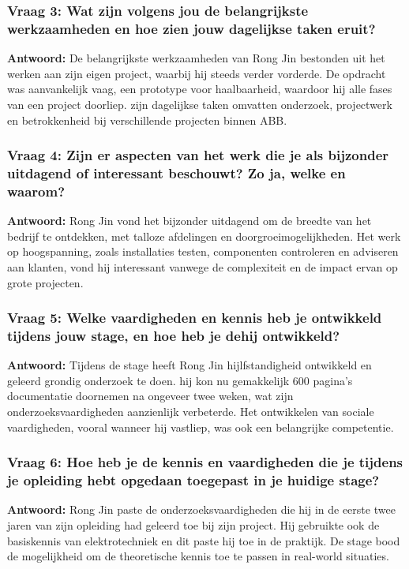\subsubsection*{Vraag 3: Wat zijn volgens jou de belangrijkste werkzaamheden en hoe zien jouw dagelijkse taken eruit?}

\textbf{Antwoord:} De belangrijkste werkzaamheden van Rong Jin bestonden uit het werken aan zijn eigen project, waarbij hij steeds verder vorderde. De opdracht was aanvankelijk vaag, een prototype voor haalbaarheid, waardoor hij alle fases van een project doorliep. zijn dagelijkse taken omvatten onderzoek, projectwerk en betrokkenheid bij verschillende projecten binnen ABB.

\subsubsection*{Vraag 4: Zijn er aspecten van het werk die je als bijzonder uitdagend of interessant beschouwt? Zo ja, welke en waarom?}

\textbf{Antwoord:} Rong Jin vond het bijzonder uitdagend om de breedte van het bedrijf te ontdekken, met talloze afdelingen en doorgroeimogelijkheden. Het werk op hoogspanning, zoals installaties testen, componenten controleren en adviseren aan klanten, vond hij interessant vanwege de complexiteit en de impact ervan op grote projecten.

\subsubsection*{Vraag 5: Welke vaardigheden en kennis heb je ontwikkeld tijdens jouw stage, en hoe heb je dehij ontwikkeld?}

\textbf{Antwoord:} Tijdens de stage heeft Rong Jin hijlfstandigheid ontwikkeld en geleerd grondig onderzoek te doen. hij kon nu gemakkelijk 600 pagina's documentatie doornemen na ongeveer twee weken, wat zijn onderzoeksvaardigheden aanzienlijk verbeterde. Het ontwikkelen van sociale vaardigheden, vooral wanneer hij vastliep, was ook een belangrijke competentie.

\subsubsection*{Vraag 6: Hoe heb je de kennis en vaardigheden die je tijdens je opleiding hebt opgedaan toegepast in je huidige stage?}

\textbf{Antwoord:} Rong Jin paste de onderzoeksvaardigheden die hij in de eerste twee jaren van zijn opleiding had geleerd toe bij zijn project. Hij gebruikte ook de basiskennis van elektrotechniek en dit paste hij toe in de praktijk. De stage bood de mogelijkheid om de theoretische kennis toe te passen in real-world situaties.

